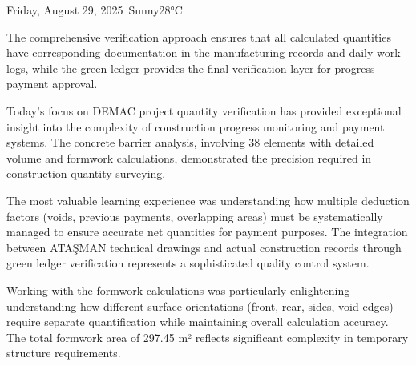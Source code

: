 \begin{dailyentry}{Friday, August 29, 2025}{\weathersunny\ Sunny}{28°C}
\begin{center}
{%
}
\end{center}

The comprehensive verification approach ensures that all calculated quantities have corresponding documentation in the manufacturing records and daily work logs, while the green ledger provides the final verification layer for progress payment approval.

\begin{dailynotes}
Today's focus on DEMAC project quantity verification has provided exceptional insight into the complexity of construction progress monitoring and payment systems. The concrete barrier analysis, involving 38 elements with detailed volume and formwork calculations, demonstrated the precision required in construction quantity surveying.

The most valuable learning experience was understanding how multiple deduction factors (voids, previous payments, overlapping areas) must be systematically managed to ensure accurate net quantities for payment purposes. The integration between ATAŞMAN technical drawings and actual construction records through green ledger verification represents a sophisticated quality control system.

Working with the formwork calculations was particularly enlightening - understanding how different surface orientations (front, rear, sides, void edges) require separate quantification while maintaining overall calculation accuracy. The total formwork area of 297.45 m² reflects significant complexity in temporary structure requirements.


\end{dailynotes}
\end{dailyentry}
